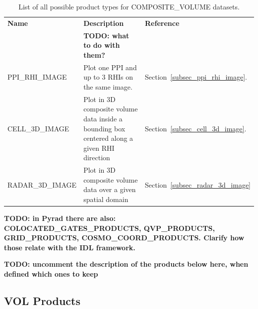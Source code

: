 \documentclass[a4paper,11pt,pdftex,twoside]{scrartcl}
\renewcommand{\bf}{\normalfont \bfseries}
\begin{document}
{{{\begin{table}[H]
\begin{tabularx}{\textwidth}{lXl}
{\bf Name} & {\bf Description} & {\bf Reference}\\
& {\bf TODO: what to do with them?} & \\

PPI\_RHI\_IMAGE   & Plot one PPI and up to 3 RHIs on the same image.    & Section~\ref{subsec_ppi_rhi_image}.\\
CELL\_3D\_IMAGE   & Plot in 3D composite volume data inside a bounding box centered along a given RHI direction
                                                                        & Section~\ref{subsec_cell_3d_image}.\\
RADAR\_3D\_IMAGE  & Plot  in 3D composite volume data over a given spatial domain
                                                                         & Section~\ref{subsec_radar_3d_image}\\
\end{tabularx}
\caption{List of all possible product types for COMPOSITE\_VOLUME datasets.}
\label{tab_products_composite_volume}
\end{table}

{\bf TODO: in Pyrad there are also: COLOCATED\_GATES\_PRODUCTS, QVP\_PRODUCTS, GRID\_PRODUCTS, COSMO\_COORD\_PRODUCTS. Clarify how those relate with the IDL framework.}

{\bf TODO: uncomment the description of the products below here, when defined which ones to keep}

\subsection{VOL Products}




}}}
\end{document}
